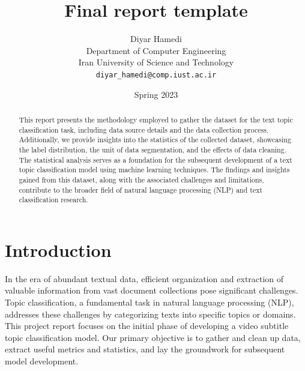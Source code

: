 \documentclass{article}
\title{Final report template}
\author{
  Diyar Hamedi\\
  Department of Computer Engineering\\
  Iran University of Science and Technology\\
  \texttt{diyar\_hamedi@comp.iust.ac.ir}\\
}
\date{Spring 2023}
\begin{document}
\pagestyle{fancy}
\fancyhead{}
\setlength{\headheight}{35.11143pt}

\maketitle

\begin{abstract}
  This report presents the methodology employed to gather the dataset for the text topic classification task, including data source details and the data collection process.
  Additionally, we provide insights into the statistics of the collected dataset, showcasing the label distribution, the unit of data segmentation, and the effects of data cleaning.
  The statistical analysis serves as a foundation for the subsequent development of a text topic classification model using machine learning techniques.
  The findings and insights gained from this dataset, along with the associated challenges and limitations, contribute to the broader field of natural language processing (NLP) and text classification research.
\end{abstract}

\section{Introduction}
In the era of abundant textual data, efficient organization and extraction of valuable information from vast document collections pose significant challenges.
Topic classification, a fundamental task in natural language processing (NLP), addresses these challenges by categorizing texts into specific topics or domains.
This project report focuses on the initial phase of developing a video subtitle topic classification model.
Our primary objective is to gather and clean up data, extract useful metrics and statistics, and lay the groundwork for subsequent model development.
\end{document}
